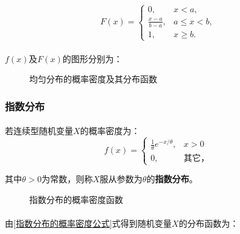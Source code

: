 \begin{equation}
  F(x) = \left\{ \begin{array}{ll}
    0, & x < a, \\
    \frac{x-a}{b-a}, & a \leq x < b, \\
    1, & x \geq b.
  \end{array} \right.
\end{equation}

\paragraph{}
$f(x)$及$F(x)$的图形分别为：

\begin{figure}[H]
\centering
  \begin{subfigure}[t]{0.48\linewidth}
    \centering
      
  \end{subfigure}
  \begin{subfigure}[t]{0.48\linewidth}
    \centering
      
  \end{subfigure}
  \caption{均匀分布的概率密度及其分布函数}
  \label{均匀分布的概率密度及其分布函数}
\end{figure}

\subsubsection{指数分布}
\paragraph{}
若连续型随机变量$X$的概率密度为：
\begin{equation}
  \label{指数分布的概率密度公式}
  f(x) = \left\{ \begin{array}{ll}
    \frac{1}{\theta}e^{-x/\theta}, & x > 0 \\ 0, & \text{其它，}
  \end{array} \right.
\end{equation}

其中$\theta > 0$为常数，则称$X$服从参数为$\theta$的\textbf{指数分布}。

\begin{figure}[H]
  \centering
    
    \caption{指数分布的概率密度函数}
    \label{指数分布的概率密度函数}
\end{figure}

\paragraph{}
由\eqref{指数分布的概率密度公式}式得到随机变量$X$的分布函数为：

